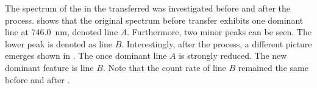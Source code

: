 	The spectrum of the \siv in the transferred \nd was investigated before and after the \pp process.  shows that the original spectrum before \nd transfer exhibits one dominant line at \SI{746.0}{nm}, denoted line $A$. Furthermore, two minor peaks can be seen. The lower \wl peak is denoted as line $B$. Interestingly, after the \pp process, a different picture emerges shown in . The once dominant line $A$ is strongly reduced. The new dominant feature is line $B$. Note that the count rate of line $B$ remained the same before and after \pp.


	\begin{figure}[!htb]
		\begin{subfigure}[t]{ 0.49\linewidth}
			\centering
			\caption{}
			\label{subfig::spectrum_diamond_for_vcsel_before_pp}
		\end{subfigure}
		\hfill
		\begin{subfigure}[t]{ 0.49\linewidth}
			\centering

\end{subfigure}
\end{figure}
